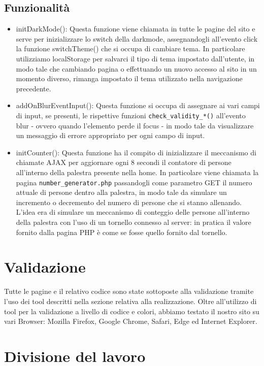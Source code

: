 \documentclass[a4paper]{article}
\begin{document}
    \subsection{Funzionalità}
    \begin{itemize}
        \item initDarkMode(): Questa funzione viene chiamata in tutte le pagine del sito e serve per inizializzare lo switch della darkmode, assegnandogli all’evento click la funzione switchTheme() che si occupa di cambiare tema. In particolare utilizziamo localStorage per salvarci il tipo di tema impostato dall’utente, in modo tale che cambiando pagina o effettuando un nuovo accesso al sito in un momento diverso, rimanga impostato il tema utilizzato nella navigazione precedente.
        \item addOnBlurEventInput(): Questa funzione si occupa di assegnare ai vari campi di input, se presenti, le rispettive funzioni \texttt{check\_validity\_*()} all’evento blur - ovvero quando l’elemento perde il focus - in modo tale da visualizzare un messaggio di errore appropriato per ogni campo di input.
        \item initCounter(): Questa funzione ha il compito di inizializzare il meccanismo di chiamate AJAX per aggiornare ogni 8 secondi il contatore di persone all’interno della palestra presente nella home. In particolare viene chiamata la pagina \texttt{number\_generator.php} passandogli come parametro GET il numero attuale di persone dentro alla palestra, in modo tale da simulare un incremento o decremento del numero di persone che si stanno allenando. L’idea era di simulare un meccanismo di conteggio delle persone all’interno della palestra con l’uso di un tornello connesso al server: in pratica il valore fornito dalla pagina PHP è come se fosse quello fornito dal tornello.
    \end{itemize}

    \section{Validazione}
    Tutte le  pagine e il relativo codice sono state sottoposte alla validazione tramite l’uso dei tool descritti nella sezione relativa alla realizzazione. Oltre all’utilizzo di tool per la validazione a livello di codice e colori, abbiamo testato il nostro sito su vari Browser: Mozilla Firefox, Google Chrome, Safari, Edge ed Internet Explorer.

    \section{Divisione del lavoro}
\end{document}
